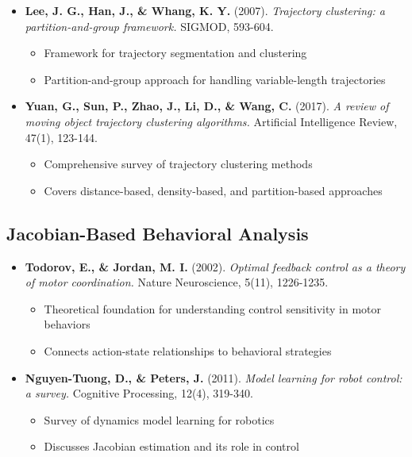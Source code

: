 \documentclass[11pt,a4paper]{article}
\begin{document}
\begin{itemize}[leftmargin=*]
    \item \textbf{Lee, J. G., Han, J., \& Whang, K. Y.} (2007). \textit{Trajectory clustering: a partition-and-group framework.} SIGMOD, 593-604.
    \begin{itemize}
        \item Framework for trajectory segmentation and clustering
        \item Partition-and-group approach for handling variable-length trajectories
    \end{itemize}
    
    \item \textbf{Yuan, G., Sun, P., Zhao, J., Li, D., \& Wang, C.} (2017). \textit{A review of moving object trajectory clustering algorithms.} Artificial Intelligence Review, 47(1), 123-144.
    \begin{itemize}
        \item Comprehensive survey of trajectory clustering methods
        \item Covers distance-based, density-based, and partition-based approaches
    \end{itemize}
\end{itemize}

\subsection{Jacobian-Based Behavioral Analysis}

\begin{itemize}[leftmargin=*]
    \item \textbf{Todorov, E., \& Jordan, M. I.} (2002). \textit{Optimal feedback control as a theory of motor coordination.} Nature Neuroscience, 5(11), 1226-1235.
    \begin{itemize}
        \item Theoretical foundation for understanding control sensitivity in motor behaviors
        \item Connects action-state relationships to behavioral strategies
    \end{itemize}
    
    \item \textbf{Nguyen-Tuong, D., \& Peters, J.} (2011). \textit{Model learning for robot control: a survey.} Cognitive Processing, 12(4), 319-340.
    \begin{itemize}
        \item Survey of dynamics model learning for robotics
        \item Discusses Jacobian estimation and its role in control
    \end{itemize}
\end{itemize}
\end{document}
